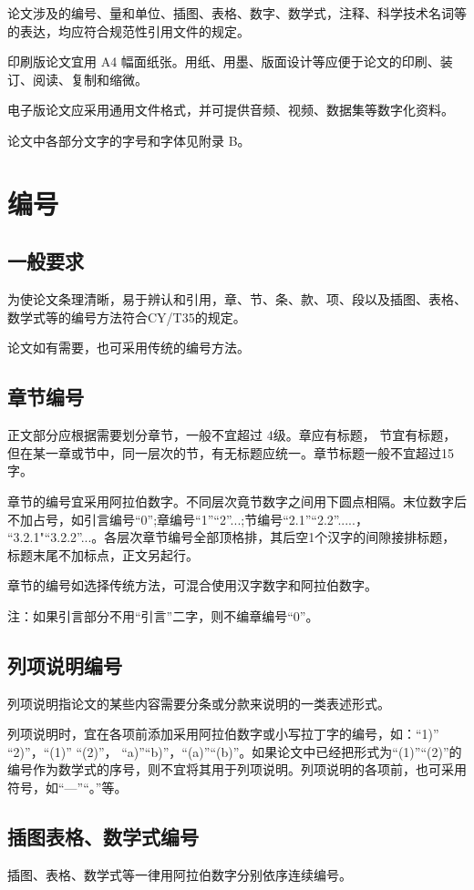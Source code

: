 论文涉及的编号、量和单位、插图、表格、数字、数学式，注释、科学技术名词等的表达，均应符合规范性引用文件的规定。

印刷版论文宜用 A4 幅面纸张。用纸、用墨、版面设计等应便于论文的印刷、装订、阅读、复制和缩微。

电子版论文应采用通用文件格式，并可提供音频、视频、数据集等数字化资料。

论文中各部分文字的字号和字体见附录 B。

\section{编号}
\subsection{ 一般要求}
为使论文条理清晰，易于辨认和引用，章、节、条、款、项、段以及插图、表格、数学式等的编号方法符合CY/T35的规定。

论文如有需要，也可采用传统的编号方法。

\subsection{章节编号}
正文部分应根据需要划分章节，一般不宜超过 4级。章应有标题， 节宜有标题，但在某一章或节中，同一层次的节，有无标题应统一。章节标题一般不宜超过15字。

章节的编号宜采用阿拉伯数字。不同层次竟节数字之间用下圆点相隔。末位数字后不加占号，如引言编号“0”;章编号“1”“2”...;节编号“2.1”“2.2”.....， “3.2.1"“3.2.2”...。各层次章节编号全部顶格排，其后空1个汉字的间隙接排标题，标题末尾不加标点，正文另起行。

章节的编号如选择传统方法，可混合使用汉字数字和阿拉伯数字。

注：如果引言部分不用“引言”二字，则不编章编号“0”。

\subsection{列项说明编号}
列项说明指论文的某些内容需要分条或分款来说明的一类表述形式。

列项说明时，宜在各项前添加采用阿拉伯数字或小写拉丁字的编号，如：“1)” “2)”，“(1)” “(2)”， “a)”\linebreak “b)”，“(a)”“(b)”。如果论文中已经把形式为“(1)”“(2)”的编号作为数学式的序号，则不宜将其用于列项说明。列项说明的各项前，也可采用符号，如“---”“。”等。

\subsection{ 插图表格、数学式编号}
插图、表格、数学式等一律用阿拉伯数字分别依序连续编号。

